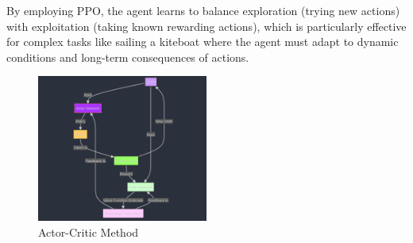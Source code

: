 By employing PPO, the agent learns to balance exploration (trying new actions) with exploitation (taking known rewarding actions), which is particularly effective for complex tasks like sailing a kiteboat where the agent must adapt to dynamic conditions and long-term consequences of actions.

\begin{figure}
    \centering
    \includegraphics[width=0.5\textwidth]{Images/ppo_explanation.png}
    \caption{Actor-Critic Method}\label{actor_critic}
\end{figure}